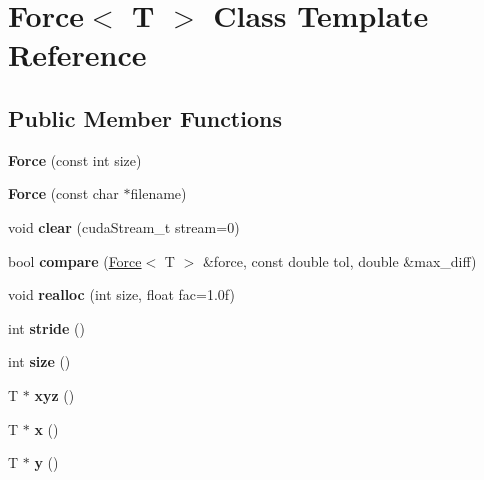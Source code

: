 \hypertarget{classForce}{}\section{Force$<$ T $>$ Class Template Reference}
\label{classForce}
\subsection*{Public Member Functions}
\begin{DoxyCompactItemize}
\item 
\hypertarget{classForce_a145e0ff7bda78e4f7a02585ab872fdef}{}\label{classForce_a145e0ff7bda78e4f7a02585ab872fdef} 
{\bfseries Force} (const int size)
\item 
\hypertarget{classForce_a3a736e0759745627afcc2ebb4872f621}{}\label{classForce_a3a736e0759745627afcc2ebb4872f621} 
{\bfseries Force} (const char $\ast$filename)
\item 
\hypertarget{classForce_aaab76d180d88fb248796ef7bd1576aa4}{}\label{classForce_aaab76d180d88fb248796ef7bd1576aa4} 
void {\bfseries clear} (cuda\+Stream\+\_\+t stream=0)
\item 
\hypertarget{classForce_af1d6088a25d72fc0f3160f8493a6af0f}{}\label{classForce_af1d6088a25d72fc0f3160f8493a6af0f} 
bool {\bfseries compare} (\hyperlink{classForce}{Force}$<$ T $>$ \&force, const double tol, double \&max\+\_\+diff)
\item 
\hypertarget{classForce_a31214fcb8057b93e9848d63e01b5461f}{}\label{classForce_a31214fcb8057b93e9848d63e01b5461f} 
void {\bfseries realloc} (int size, float fac=1.\+0f)
\item 
\hypertarget{classForce_a2a7df876bb86661ca8b09060b4f4be0b}{}\label{classForce_a2a7df876bb86661ca8b09060b4f4be0b} 
int {\bfseries stride} ()
\item 
\hypertarget{classForce_a1f4901db11adfff6bc865d0f0bce315f}{}\label{classForce_a1f4901db11adfff6bc865d0f0bce315f} 
int {\bfseries size} ()
\item 
\hypertarget{classForce_aaac0c45ec731e03e0a5bdde7f6cfd6af}{}\label{classForce_aaac0c45ec731e03e0a5bdde7f6cfd6af} 
T $\ast$ {\bfseries xyz} ()
\item 
\hypertarget{classForce_a82545001d04b0bb20599025057ba58c9}{}\label{classForce_a82545001d04b0bb20599025057ba58c9} 
T $\ast$ {\bfseries x} ()
\item 
\hypertarget{classForce_ad456efc59a453daf3a5be43592d708a2}{}\label{classForce_ad456efc59a453daf3a5be43592d708a2} 
T $\ast$ {\bfseries y} ()

\end{DoxyCompactItemize}
